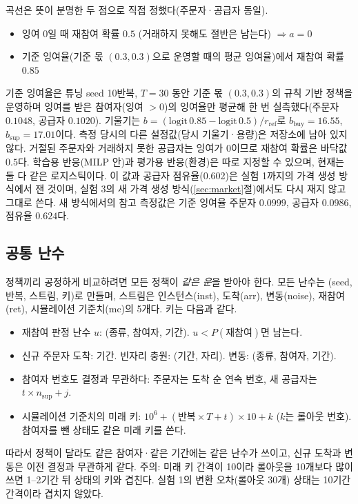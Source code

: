 \documentclass[11pt,a4paper]{article}
\begin{document}
곡선은 뜻이 분명한 두 점으로 직접 정했다(주문자·공급자 동일).
\begin{itemize}[leftmargin=1.5em]
  \item 잉여 0일 때 재참여 확률 $0.5$ (거래하지 못해도 절반은 남는다) $\Rightarrow a=0$
  \item 기준 잉여율(기준 몫 $(0.3,0.3)$으로 운영할 때의 평균 잉여율)에서 재참여 확률 $0.85$
\end{itemize}
기준 잉여율은 튜닝 seed 10반복, $T=30$ 동안 기준 몫 $(0.3,0.3)$의 규칙 기반 정책을 운영하며 잉여를 받은 참여자(잉여 $>0$)의
잉여율만 평균해 한 번 실측했다(주문자 $0.1048$, 공급자 $0.1020$). 기울기는 $b=(\mathrm{logit}\,0.85-\mathrm{logit}\,0.5)/r_{\mathrm{ref}}$로
$b_{\mathrm{buy}}=16.55$, $b_{\mathrm{sup}}=17.01$이다. 측정 당시의 다른 설정값(당시 기울기·용량)은 저장소에 남아 있지 않다.
거절된 주문자와 거래하지 못한 공급자는 잉여가 0이므로 재참여 확률은 바닥값 $0.5$다.
학습용 반응(MILP 안)과 평가용 반응(환경)은 따로 지정할 수 있으며, 현재는 둘 다 같은 로지스틱이다.
이 값과 공급자 점유율(0.602)은 실험 1까지의 가격 생성 방식에서 잰 것이며, 실험 3의 새 가격 생성 방식(\ref{sec:market}절)에서도
다시 재지 않고 그대로 쓴다. 새 방식에서의 참고 측정값은 기준 잉여율 주문자 $0.0999$, 공급자 $0.0986$, 점유율 $0.624$다.

\subsection{공통 난수}

정책끼리 공정하게 비교하려면 모든 정책이 \emph{같은 운}을 받아야 한다.
모든 난수는 (seed, 반복, 스트림, 키)로 만들며, 스트림은 인스턴스(inst), 도착(arr), 변동(noise), 재참여(ret),
시뮬레이션 기준치(mc)의 5개다. 키는 다음과 같다.
\begin{itemize}[leftmargin=1.5em]
  \item 재참여 판정 난수 $u$: (종류, 참여자, 기간). $u<P(\text{재참여})$면 남는다.
  \item 신규 주문자 도착: 기간. 빈자리 충원: (기간, 자리). 변동: (종류, 참여자, 기간).
  \item 참여자 번호도 결정과 무관하다: 주문자는 도착 순 연속 번호, 새 공급자는 $t\times n_{\mathrm{sup}}+j$.
  \item 시뮬레이션 기준치의 미래 키: $10^6 + (\text{반복}\times T+t)\times 10 + k$ ($k$는 롤아웃 번호).
        참여자를 뺀 상태도 같은 미래 키를 쓴다.
\end{itemize}
따라서 정책이 달라도 같은 참여자·같은 기간에는 같은 난수가 쓰이고, 신규 도착과 변동은 이전 결정과 무관하게 같다.
주의: 미래 키 간격이 10이라 롤아웃을 10개보다 많이 쓰면 1--2기간 뒤 상태의 키와 겹친다.
실험 1의 변환 오차(롤아웃 30개) 상태는 10기간 간격이라 겹치지 않았다.
\end{document}
